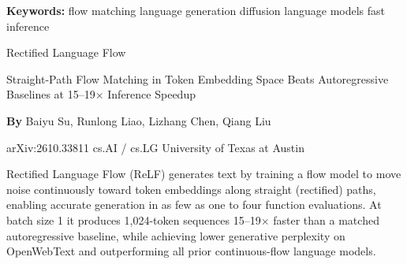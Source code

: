 \documentclass[10pt,twocolumn]{article}
\begin{document}
\setlength{\parindent}{0pt}
\setlength{\parskip}{4pt}

{\small\color{keywordgray}\textbf{Keywords:}
  flow matching \textbullet{}
  language generation \textbullet{}
  diffusion language models \textbullet{}
  fast inference}\par\vspace{4pt}

{\LARGE\bfseries\raggedright
  Rectified Language Flow}\par\vspace{4pt}

{\large\itshape\raggedright
  Straight-Path Flow Matching in Token Embedding Space Beats
  Autoregressive Baselines at 15--19$\times$ Inference Speedup}\par\vspace{6pt}

{\small\textbf{By} Baiyu Su, Runlong Liao, Lizhang Chen, Qiang Liu}\par\vspace{2pt}

{\small\color{keywordgray}arXiv:2610.33811 \textbullet{}
  cs.AI / cs.LG \textbullet{} University of Texas at Austin}
\par\vspace{2pt}\noindent{\color{rulered}\rule{\columnwidth}{0.6pt}}\vspace{6pt}

Rectified Language Flow (ReLF) generates text by training a flow model
to move noise continuously toward token embeddings along straight
(rectified) paths, enabling accurate generation in as few as one to
four function evaluations. At batch size 1 it produces 1,024-token
sequences 15--19$\times$ faster than a matched autoregressive baseline,
while achieving lower generative perplexity on OpenWebText and
outperforming all prior continuous-flow language models.
\end{document}
